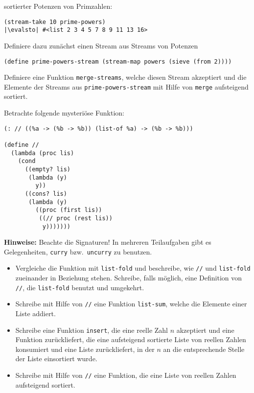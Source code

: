 \begin{aufgabe}
\begin{enumerate}
     sortierter Potenzen von Primzahlen:
     \begin{lstlisting}
(stream-take 10 prime-powers)
|\evalsto| #<list 2 3 4 5 7 8 9 11 13 16>
     \end{lstlisting}
     Definiere dazu zunächst einen Stream aus Streams von Potenzen
     \begin{lstlisting}
(define prime-powers-stream (stream-map powers (sieve (from 2))))
     \end{lstlisting}
     Definiere eine Funktion \texttt{merge-streams}, welche
     diesen Stream akzeptiert und die Elemente der Streams
     aus \texttt{prime-powers-stream} mit Hilfe von \texttt{merge}
     aufsteigend sortiert.
   \end{enumerate}
 \end{aufgabe}

 \begin{aufgabe}
  Betrachte folgende mysteriöse Funktion:
\begin{lstlisting}
(: // ((%a -> (%b -> %b)) (list-of %a) -> (%b -> %b)))

(define //
  (lambda (proc lis)
    (cond
      ((empty? lis)
       (lambda (y)
         y))
      ((cons? lis)
       (lambda (y)
         ((proc (first lis))
          ((// proc (rest lis))
           y)))))))
\end{lstlisting}
  \textbf{Hinweise:} Beachte die Signaturen! In mehreren
  Teilaufgaben gibt es Gelegenheiten, \texttt{curry} bzw.\
  \texttt{uncurry} zu benutzen.

  \begin{itemize}
  \item Vergleiche die Funktion mit \texttt{list-fold} und
    beschreibe, wie \texttt{//} und \texttt{list-fold} zueinander
    in Beziehung stehen.  Schreibe, falls möglich, eine
    Definition von \texttt{//}, die \texttt{list-fold} benutzt und
    umgekehrt.
  \item Schreibe mit Hilfe von \texttt{//} eine Funktion
    \texttt{list-sum}, welche die Elemente einer Liste addiert.
  \item Schreibe eine Funktion \texttt{insert}, die eine reelle
    Zahl $n$ akzeptiert und eine Funktion zurückliefert, die eine
    aufsteigend sortierte Liste von reellen Zahlen konsumiert und
    eine Liste zurückliefert, in der $n$ an die entsprechende
    Stelle der Liste einsortiert wurde.
  \item Schreibe mit Hilfe von \texttt{//} eine Funktion, die
    eine Liste von reellen Zahlen aufsteigend sortiert.
  \end{itemize}
\end{aufgabe}

